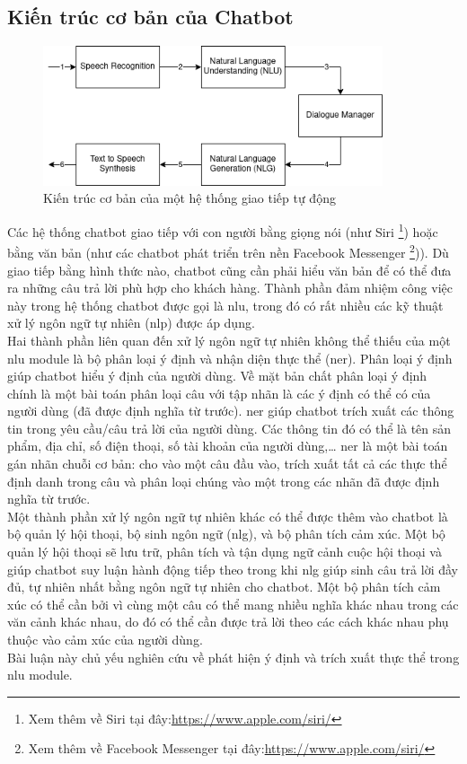 \subsection{Kiến trúc cơ bản của Chatbot}
\begin{figure}[htp]
    \centering
    \includegraphics[width=10cm]{images/Kiến trúc cơ bản của hệ thống giao tiếp tự động.png}
    \caption{Kiến trúc cơ bản của một hệ thống giao tiếp tự động}
    \label{fig:Kiến trúc cơ bản của hệ thống giao tiếp tự động}
\end{figure}

Các hệ thống chatbot giao tiếp với con người bằng giọng nói (như Siri \footnote{Xem thêm về Siri tại đây:\url{https://www.apple.com/siri/}}) hoặc bằng văn bản (như các chatbot phát triển trên nền Facebook Messenger \footnote{Xem thêm về Facebook Messenger tại đây:\url{https://www.apple.com/siri/}})). Dù giao tiếp bằng hình thức nào, chatbot cũng cần phải hiểu văn bản để có thể đưa ra những câu trả lời phù hợp cho khách hàng. Thành phần đảm nhiệm công việc này trong hệ thống chatbot được gọi là \ac{nlu}, trong đó có rất nhiều các kỹ thuật xử lý ngôn ngữ tự nhiên (\ac{nlp}) được áp dụng.
\\
Hai thành phần liên quan đến xử lý ngôn ngữ tự nhiên không thể thiếu của một \ac{nlu} module là bộ phân loại ý định và nhận diện thực thể (\ac{ner}). Phân loại ý định giúp chatbot hiểu ý định của người dùng. Về mặt bản chất phân loại ý định chính là một bài toán phân loại câu với tập nhãn là các ý định có thể có của người dùng (đã được định nghĩa từ trước). \ac{ner} giúp chatbot trích xuất các thông tin trong yêu cầu/câu trả lời của người dùng. Các thông tin đó có thể là tên sản phẩm, địa chỉ, số điện thoại, số tài khoản của người dùng,… \ac{ner} là một bài toán gán nhãn chuỗi cơ bản: cho vào một câu đầu vào, trích xuất tất cả các thực thể định danh trong câu và phân loại chúng vào một trong các nhãn đã được định nghĩa từ trước.
\\
Một thành phần xử lý ngôn ngữ tự nhiên khác có thể được thêm vào chatbot là bộ quản lý hội thoại, bộ sinh ngôn ngữ (\ac{nlg}), và bộ phân tích cảm xúc. Một bộ quản lý hội thoại sẽ lưu trữ, phân tích và tận dụng ngữ cảnh cuộc hội thoại và giúp chatbot suy luận hành động tiếp theo trong khi \ac{nlg} giúp sinh câu trả lời đầy đủ, tự nhiên nhất bằng ngôn ngữ tự nhiên cho chatbot. Một bộ phân tích cảm xúc có thể cần bởi vì cùng một câu có thể mang nhiều nghĩa khác nhau trong các văn cảnh khác nhau, do đó có thể cần được trả lời theo các cách khác nhau phụ thuộc vào cảm xúc của người dùng.
\\
Bài luận này chủ yếu nghiên cứu về phát hiện ý định và trích xuất thực thể trong \ac{nlu} module.

